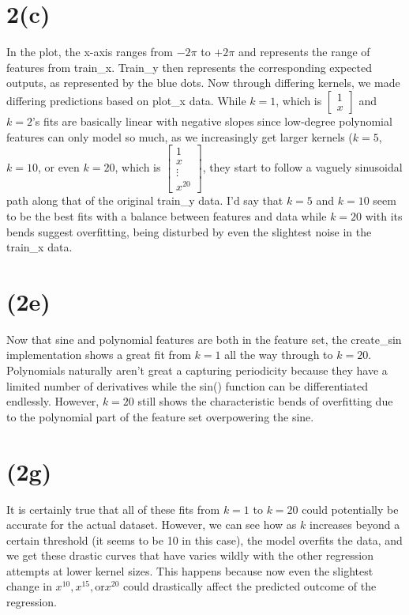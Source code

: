 \documentclass{article}
\begin{document}
\section{2(c)}
In the plot, the x-axis ranges from $-2 \pi$ to $+2 \pi$ and represents the range of features from train\_x. Train\_y then represents the corresponding expected outputs, as represented by the blue dots. Now through differing kernels, we made differing predictions based on plot\_x data. While $k=1$, which is $\left [ \begin{array}{c} 1 \\ x \end{array} \right ]$ and $k=2$'s fits are basically linear with negative slopes since low-degree polynomial features can only model so much, as we increasingly get larger kernels ($k=5$, $k=10$, or even $k=20$, which is $\left [ \begin{array}{c} 1 \\ x  \\ \vdots \\ x^{20}\end{array} \right ]$, they start to follow a vaguely sinusoidal path along that of the original train\_y data. I'd say that $k=5$ and $k=10$ seem to be the best fits with a balance between features and data while $k=20$ with its bends suggest overfitting, being disturbed by even the slightest noise in the train\_x data.

\section{(2e)}

Now that sine and polynomial features are both in the feature set, the create\_sin implementation shows a great fit from $k=1$ all the way through to $k=20$. Polynomials naturally aren't great a capturing periodicity because they have a limited number of derivatives while the sin() function can be differentiated endlessly. However, $k=20$ still shows the characteristic bends of overfitting due to the polynomial part of the feature set overpowering the sine.

\section{(2g)}
It is certainly true that all of these fits from $k=1$ to $k=20$ could potentially be accurate for the actual dataset. However, we can see how as $k$ increases beyond a certain threshold (it seems to be 10 in this case), the model overfits the data, and we get these drastic curves that have varies wildly with the other regression attempts at lower kernel sizes. This happens because now even the slightest change in $x^{10}, x^{15}, \text{or} x^{20}$ could drastically affect the predicted outcome of the regression.
\end{document}
